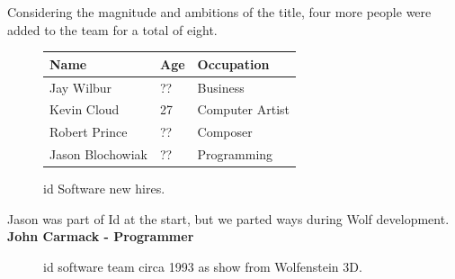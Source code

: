 \documentclass[book.tex]{subfiles}
\begin{document}
Considering the magnitude and ambitions of the title, four more people were added to the team for a total of eight.\\

 \begin{figure}[H]
\centering  
\begin{tabularx}{\textwidth}{ X  X  X  }
  \toprule
  \textbf{Name} &  \textbf{Age} & \textbf{Occupation} \\
  \toprule 
   Jay Wilbur & ?? &  Business\\
   Kevin Cloud & 27 &  Computer Artist\\
   Robert Prince & ?? &  Composer\\
   Jason Blochowiak & ?? &   Programming\\
     \toprule
\end{tabularx}
\caption{id Software new hires.}\label{fig:Id Software hires}
\end{figure}

\begin{fancyquotes}
Jason was part of Id at the start, but we parted ways during Wolf development.
 \bigskip \\
\textbf{John Carmack - Programmer}
 \end{fancyquotes}
 
\begin{figure}[H]
\centering
\caption{id software team circa 1993 as show from Wolfenstein 3D.}
\label{fig:id_team_1993}
\end{figure}
 
\end{document}
